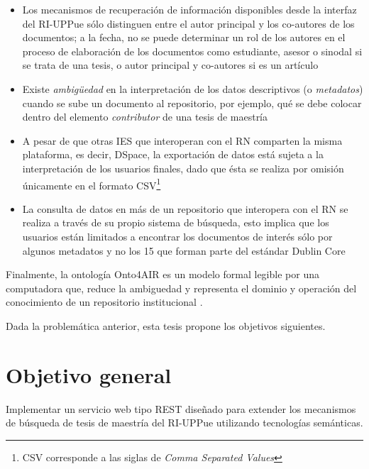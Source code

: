 \begin{itemize}
\item Los mecanismos de recuperaci\'on de informaci\'on disponibles desde la interfaz del RI-UPPue s\'olo distinguen entre el autor principal y los co-autores de los documentos; a la fecha, no se puede determinar un rol de los autores en el proceso de elaboraci\'on de los documentos como estudiante, asesor o sinodal si se trata de una tesis, o autor principal y co-autores si es un art\'iculo

\item Existe \textit{ambig\"{u}edad} en la interpretaci\'on de los datos descriptivos (o \emph{metadatos}) cuando se sube un documento al repositorio, por ejemplo, qu\'e se debe colocar dentro del elemento \emph{contributor} de una tesis de maestr\'ia

\item A pesar de que otras IES que interoperan con el RN comparten la misma plataforma, es decir, DSpace, la exportaci\'on de datos est\'a sujeta a la interpretaci\'on de los usuarios finales, dado que \'esta se realiza por omisi\'on \'unicamente en el formato CSV\footnote{CSV corresponde a las siglas de \emph{Comma Separated Values}}

\item La consulta de datos en m\'as de un repositorio que interopera con el RN se realiza a trav\'es de su propio sistema de b\'usqueda, esto implica que los usuarios est\'an limitados a encontrar los documentos de inter\'es s\'olo por algunos metadatos y no los 15 que forman parte del est\'andar Dublin Core \cite{DublinCore}

\end{itemize}

Finalmente, la ontolog\'ia Onto4AIR es un modelo formal legible por una computadora que, reduce la ambiguedad y representa el dominio y operaci\'on del conocimiento de un repositorio institucional \cite{representacionSemantica}.

Dada la problem\'atica anterior, esta tesis propone los objetivos siguientes. 

\section{Objetivo general} 

Implementar un servicio web tipo REST dise\~{n}ado para extender los mecanismos de b\'usqueda de tesis de maestr\'ia del RI-UPPue utilizando tecnolog\'ias sem\'anticas. \newline

